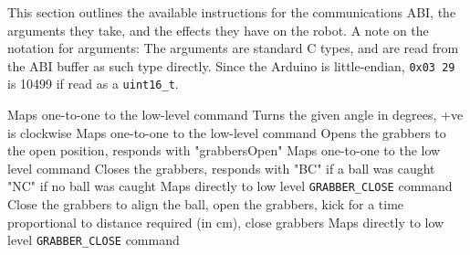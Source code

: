 This section outlines the available instructions for the communications ABI, the arguments they take, and the effects they have on the robot.
A note on the notation for arguments: The arguments are standard C types, and are read from the ABI buffer as such type directly. 
Since the Arduino is little-endian, \texttt{0x03 29} is 10499 if read as a \texttt{uint16\_t}.

    {Maps one-to-one to the low-level  command}
    {Turns the given angle in degrees, +ve is clockwise}
    {Maps one-to-one to the low-level  command}
    {Opens the grabbers to the open position, responds with "grabbersOpen"}
    {Maps one-to-one to the low level  command}
    {Closes the grabbers, responds with "BC" if a ball was caught "NC" if no ball was caught}
    {Maps directly to low level \texttt{GRABBER_CLOSE} command}
    {Close the grabbers to align the ball, open the grabbers, kick for a time proportional to distance required (in cm), close grabbers}
    {Maps directly to low level \texttt{GRABBER_CLOSE} command}
